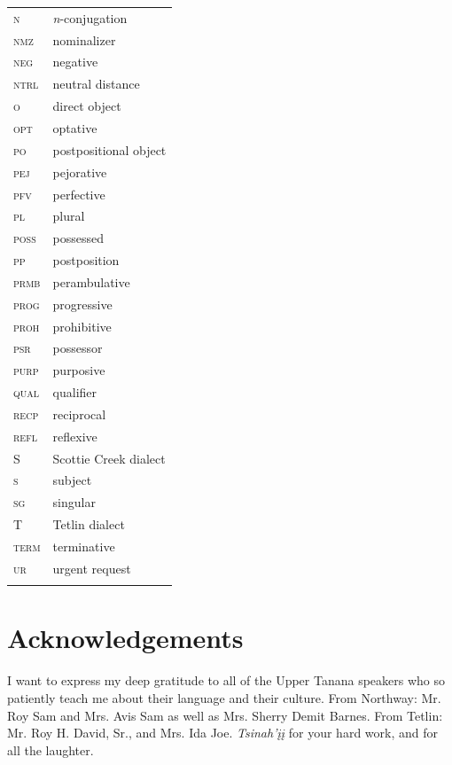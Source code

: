 \documentclass[output=paper,colorlinks,citecolor=brown
]{langscibook}
\begin{document}
\begin{tabularx}{.5\textwidth}{@{}lQ@{}}
\textsc{n} & \textit{n}-conjugation \\
\textsc{nmz} & nominalizer \\
\textsc{neg} & negative \\
\textsc{ntrl} & neutral distance \\
\textsc{o} & direct object \\
\textsc{opt} & optative \\
\textsc{po} & postpositional object \\
\textsc{pej} & pejorative \\
\textsc{pfv} & perfective \\
\textsc{pl} & plural \\
\textsc{poss} & possessed \\
\textsc{pp} & postposition \\
\textsc{prmb} & perambulative \\
\textsc{prog} & progressive \\
\textsc{proh} & prohibitive \\
\textsc{psr} & possessor \\
\textsc{purp} & purposive \\
\textsc{qual} & qualifier \\
\textsc{recp} & reciprocal \\
\textsc{refl} & reflexive \\
S & Scottie Creek dialect \\
\textsc{s} & subject \\
\textsc{sg} & singular \\
T & Tetlin dialect \\
\textsc{term} & terminative \\
\textsc{ur} & urgent request \\\\
\end{tabularx}


\section*{Acknowledgements}

I want to express my deep gratitude to all of the Upper Tanana speakers who so patiently teach me about their language and their culture. From Northway: Mr. Roy Sam and Mrs. Avis Sam as well as Mrs. Sherry Demit Barnes. From Tetlin: Mr. Roy H. David, Sr., and Mrs. Ida Joe. \textit{Tsinah'įį} for your hard work, and for all the laughter. 
\end{document}

